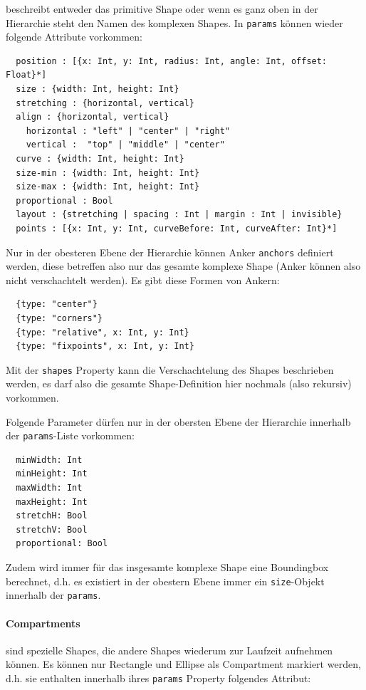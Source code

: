  beschreibt entweder das primitive Shape oder wenn es ganz oben
in der Hierarchie steht den Namen des komplexen Shapes.
In {\tt params} können wieder folgende Attribute vorkommen:

\begin{verbatim}
  position : [{x: Int, y: Int, radius: Int, angle: Int, offset: Float}*]
  size : {width: Int, height: Int}
  stretching : {horizontal, vertical}
  align : {horizontal, vertical}
    horizontal : "left" | "center" | "right"
    vertical :  "top" | "middle" | "center"
  curve : {width: Int, height: Int}
  size-min : {width: Int, height: Int}
  size-max : {width: Int, height: Int}
  proportional : Bool
  layout : {stretching | spacing : Int | margin : Int | invisible}
  points : [{x: Int, y: Int, curveBefore: Int, curveAfter: Int}*]
\end{verbatim}

\noindent Nur in der obesteren Ebene der Hierarchie können Anker {\tt anchors} definiert werden,
diese betreffen also nur das gesamte komplexe Shape (Anker können also
nicht verschachtelt werden). Es gibt diese Formen von Ankern:

\begin{verbatim}
  {type: "center"}
  {type: "corners"}
  {type: "relative", x: Int, y: Int}
  {type: "fixpoints", x: Int, y: Int}
\end{verbatim}

\noindent Mit der {\tt shapes} Property kann die Verschachtelung des Shapes beschrieben
werden, es darf also die gesamte Shape-Definition hier nochmals (also
rekursiv) vorkommen.

Folgende Parameter dürfen nur in der obersten Ebene der Hierarchie innerhalb
der {\tt params}-Liste vorkommen:

\begin{verbatim}
  minWidth: Int
  minHeight: Int
  maxWidth: Int
  maxHeight: Int
  stretchH: Bool
  stretchV: Bool
  proportional: Bool
\end{verbatim}

\noindent Zudem wird immer für das insgesamte komplexe Shape eine Boundingbox berechnet,
d.h. es existiert in der obestern Ebene immer ein {\tt size}-Objekt innerhalb
der {\tt params}.

\paragraph{Compartments} sind spezielle Shapes, die andere Shapes wiederum
zur Laufzeit aufnehmen können. Es können nur Rectangle und Ellipse als
Compartment markiert werden, d.h. sie enthalten innerhalb ihres {\tt params}
Property folgendes Attribut:


